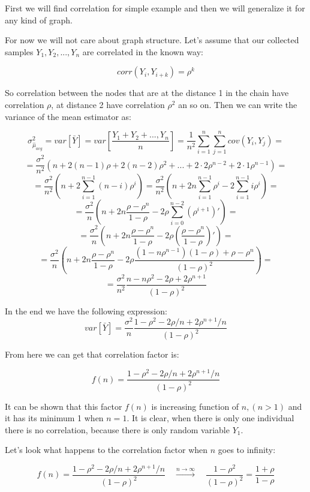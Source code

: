 \documentclass[12pt]{report}
\begin{document}
First we will find correlation for simple example and then we will generalize it for any kind of graph.

For now we will not care about graph structure. Let's assume that our collected samples $Y_1, Y_2, ..., Y_n$ are correlated in the known way:

 $$corr(Y_i, Y_{i+k}) = \rho^k$$

So correlation between the nodes that are at the distance 1 in the chain have correlation $\rho$, at distance 2 have correlation $\rho^2$ an so on. 
Then we can write the variance of the mean estimator as: 

$$\sigma^2_{\hat{\mu}_{avg}} = var\left[\bar{Y} \right] = var\left[ \frac{Y_1 + Y_2 + ..., Y_n}{n} \right] = \frac{1}{n^2} \sum_{i=1}^{n}\sum_{j=1}^{n} cov(Y_i, Y_j) =$$ 
$$ = \frac{\sigma^2}{n^2} \left( n + 2(n-1)\rho + 2(n-2)\rho^2 + ... + 2\cdot2 \rho^{n-2}+ 2\cdot1 \rho^{n-1} \right) = $$
$$ = \frac{\sigma^2}{n^2} \left(n + 2\sum_{i=1}^{n-1} (n-i)\rho^i \right) = \frac{\sigma^2}{n^2} \left(n + 2n\sum_{i=1}^{n-1}\rho^i - 2\sum_{i=1}^{n-1}i\rho^i \right) = $$
$$ = \frac{\sigma^2}{n} \left(n + 2n\frac{\rho-\rho^{n}}{1-\rho} - 2\rho \sum_{i=0}^{n-2} (\rho^{i+1})' \right) = $$
$$ = \frac{\sigma^2}{n} \left(n + 2n\frac{\rho-\rho^{n}}{1-\rho} - 2\rho\left(\frac{\rho-\rho^n}{1-\rho}\right)' \right) = $$
$$ = \frac{\sigma^2}{n} \left(n + 2n\frac{\rho-\rho^{n}}{1-\rho} - 2\rho \frac{(1-n\rho^{n-1})(1-\rho) + \rho - \rho^n}{(1-\rho)^2} \right) = $$
$$ = \frac{\sigma^2}{n^2} \frac{n-n\rho^2 - 2\rho + 2\rho^{n+1}}{(1-\rho)^2}$$

In the end we have the following expression:
\begin{equation}
var\left[\bar{Y} \right] = \frac{\sigma^2}{n}\frac{1-\rho^2 - 2\rho/n + 2\rho^{n+1}/n}{(1-\rho)^2}
\end{equation}
\label{eq:varFirst}

From here we can get that correlation factor is:

$$f(n) = \frac{1-\rho^2 - 2\rho/n + 2\rho^{n+1}/n}{(1-\rho)^2} $$

It can be shown that this factor $f(n)$ is increasing function of $n, (n > 1)$ and it has its minimum 1 when $n = 1$. It is clear, when there is only one individual there is no correlation, because there is only random variable $Y_1$.

Let's look what happens to the correlation factor when $n$ goes to infinity:

$$f(n)  = \frac{1-\rho^2 - 2\rho/n + 2\rho^{n+1}/n}{(1-\rho)^2} \quad \xrightarrow{n\to \infty} \quad\frac{1-\rho^2}{(1-\rho)^2} = \frac{1+\rho}{1-\rho}$$
\end{document}
